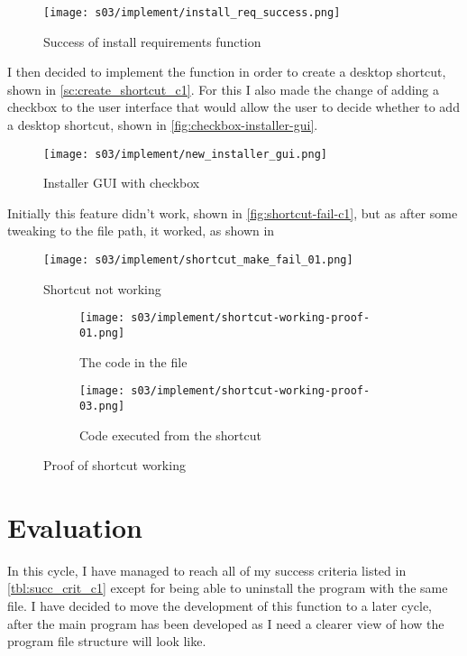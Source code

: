     \begin{figure}[!ht]
        \centering
        \texttt{[image: s03/implement/install\_req\_success.png]}
        \caption{Success of install requirements function}
        \label{fig:install-req-success}
    \end{figure}

    I then decided to implement the function in order to create a desktop shortcut, shown in \autoref{sc:create_shortcut_c1}. 
    For this I also made the change of adding a checkbox to the user interface that would allow the user to decide whether to add a desktop shortcut, shown in \autoref{fig:checkbox-installer-gui}. 


    \begin{figure}[!ht]
        \centering
        \texttt{[image: s03/implement/new\_installer\_gui.png]}
        \caption{Installer GUI with checkbox}
        \label{fig:checkbox-installer-gui}
    \end{figure}

    Initially this feature didn't work, shown in \autoref{fig:shortcut-fail-c1}, but as after some tweaking to the file path, it worked, as shown in 

    \begin{figure}[!ht]
        \centering
        \texttt{[image: s03/implement/shortcut\_make\_fail\_01.png]}
        \caption{Shortcut not working}
        \label{fig:shortcut-fail-c1}
    \end{figure}

    \begin{figure}[!ht]
        \centering
        \begin{subfigure}{.4\textwidth}
            \centering
            \texttt{[image: s03/implement/shortcut-working-proof-01.png]}
            \caption{The code in the file}
            \label{fig:sc-working-proof-1-c1}
        \end{subfigure}%
        \begin{subfigure}{.4\textwidth}
            \centering
            \texttt{[image: s03/implement/shortcut-working-proof-03.png]}
            \caption{Code executed from the shortcut}
            \label{fig:}
        \end{subfigure}%
        \caption{Proof of shortcut working}
    \end{figure}



\section{Evaluation}
    In this cycle, I have managed to reach all of my success criteria listed in \autoref{tbl:succ_crit_c1} except for being able to uninstall the program with the same file. 
    I have decided to move the development of this function to a later cycle, after the main program has been developed as I need a clearer view of how the program file structure will look like. 
